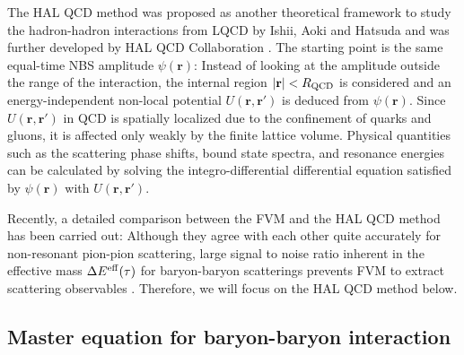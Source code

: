   The HAL QCD method was proposed as another theoretical framework to study the hadron-hadron interactions from LQCD
 by Ishii, Aoki and Hatsuda \cite{Ishii:2006ec}
  and was further developed by  HAL QCD Collaboration \cite{HALQCD:2012aa}.
    The starting point is the same equal-time NBS amplitude  $\psi (\mathbf{r})$: 
  Instead of looking at the amplitude 
  outside the range of the interaction,
   the internal region $ |\mathbf{r} | < R_{\rm QCD}$ is considered and
  an energy-independent  non-local potential $U(\mathbf{r}, \mathbf{r}')$  is deduced from  $\psi (\mathbf{r})$.
    Since $U(\mathbf{r}, \mathbf{r}')$ in QCD
   is spatially  localized due to the confinement
   of quarks and gluons, it is affected  only weakly
   by the finite lattice volume. Physical quantities such 
 as the scattering phase shifts, bound state spectra,  and resonance energies
  can be calculated by solving  the
  integro-differential differential equation satisfied by $\psi (\mathbf{r})$ with $U(\mathbf{r}, \mathbf{r}')$.
   
  Recently, a detailed comparison between the FVM and the HAL QCD method has been carried out:
  Although they agree with each other quite accurately for non-resonant pion-pion scattering,
   large signal to noise ratio  inherent in the effective mass $\Delta E^{\rm eff}(\tau)$  for 
    baryon-baryon scatterings prevents FVM to extract scattering observables   \cite{Iritani:2015dhu}.
   Therefore, we will focus on  the HAL QCD method below.
  
\subsection{Master equation for baryon-baryon interaction}
  
